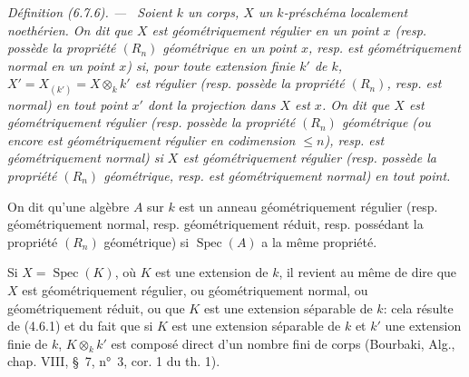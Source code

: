 \documentclass[10pt,oneside]{book}
\newcommand{\oldpage}[2][]{%
  \setcounter{footnote}{0}%
  \marginpar{\scriptsize\textbf{#1}~|~#2}\ignorespaces}
\newenvironment{definition}[1][]{%
  \par\medskip\noindent\itshape Définition (#1). ---\ }{\par}
\begin{document}
\begin{definition}[6.7.6]
\label{IV.2.s6.7.6-fr}
Soient $k$ un corps, $X$ un $k$-préschéma localement noethérien. On dit
que $X$ est géométriquement régulier en un point $x$ (resp. possède la
propriété $(R_n)$ géométrique en un point $x$, resp. est géométriquement
normal en un point $x$) si, pour toute extension finie $k'$ de $k$,
$X'=X_{(k')}=X\otimes_k k'$ est régulier (resp. possède la propriété
$(R_n)$, resp. est normal) en tout point $x'$ dont la projection dans
$X$ est $x$. On dit que $X$ est géométriquement régulier (resp. possède
la propriété $(R_n)$ géométrique (ou encore est géométriquement régulier
en codimension $\leqslant n$), resp. est géométriquement normal) si $X$
est géométriquement régulier (resp. possède la propriété $(R_n)$
géométrique, resp. est géométriquement normal) en tout point.

On dit qu'une algèbre $A$ sur $k$ est un anneau géométriquement régulier
(resp. géométriquement normal, resp. géométriquement réduit, resp.
possédant la propriété $(R_n)$ géométrique) si $\operatorname{Spec}(A)$
a la même propriété.

Si $X=\operatorname{Spec}(K)$, où $K$ est une extension de $k$, il revient
au même de dire que $X$ est géométriquement régulier, ou géométriquement
normal, ou géométriquement réduit, ou que $K$ est une extension séparable
de $k$: cela résulte de (4.6.1) et du fait que si $K$ est une extension
séparable de $k$ et $k'$ une extension finie de $k$, $K\otimes_k k'$ est
composé direct d'un nombre fini de corps (Bourbaki, Alg., chap. VIII,
§~7, n°~3, cor. 1 du th. 1).
\end{definition}

\oldpage[IV-2]{149}
\end{document}

